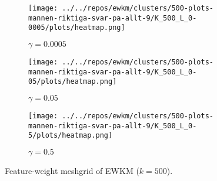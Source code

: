 \documentclass[../report.tex]{subfiles}
\begin{document}

\newpage
\begin{figure}[H]
  \centering
  \begin{subfigure}{0.7\textwidth}
    \begin{center}
      \texttt{[image: ../../repos/ewkm/clusters/500-plots-mannen-riktiga-svar-pa-allt-9/K\_500\_L\_0-0005/plots/heatmap.png]}
      \caption{$\gamma=0.0005$}
    \end{center}
  \end{subfigure}
  \medskip
  \centering
  \begin{subfigure}{0.7\textwidth}
    \begin{center}
      \texttt{[image: ../../repos/ewkm/clusters/500-plots-mannen-riktiga-svar-pa-allt-9/K\_500\_L\_0-05/plots/heatmap.png]}
      \caption{$\gamma=0.05$}
    \end{center}
  \end{subfigure}
  \medskip
  \centering
  \begin{subfigure}{0.7\textwidth}
    \begin{center}
      \texttt{[image: ../../repos/ewkm/clusters/500-plots-mannen-riktiga-svar-pa-allt-9/K\_500\_L\_0-5/plots/heatmap.png]}
      \caption{$\gamma=0.5$}
    \end{center}
  \end{subfigure}
  \caption{Feature-weight meshgrid of EWKM ($k=500$).}
  \label{fig:ewkm-meshgrid}
\end{figure}
\newpage



\end{document}
